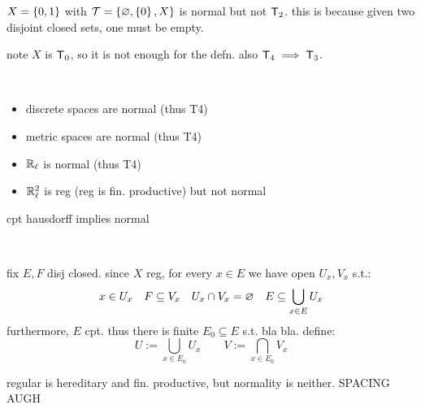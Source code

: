 \newpage
\begin{xmp}[source=Primary Source Material]
    $X=\left\{{0,1}\right\}$ with $\mathcal{T}=\left\{{\varnothing,\left\{{0}\right\},X}\right\}$ is normal but not
    $\mathsf{T}_{2}$.
    this is because given two disjoint closed sets, one must be empty.

    note $X$ is $\mathsf{T}_{0}$, so it is not enough for the defn.
    also $\mathsf{T}_{4}\implies\mathsf{T}_{3}$.
\end{xmp} \

\begin{xmp}[source=Primary Source Material]
    \vspace{-0.35in}
    \begin{itemize}
        \item discrete spaces are normal (thus T4)
        \item metric spaces are normal (thus T4)
        \item $\mathbb{R}_{\ell}$ is normal (thus T4)
        \item $\mathbb{R}_{\ell}^{2}$ is reg (reg is fin. productive) but not normal
    \end{itemize}
\end{xmp}

\begin{prop}
    cpt hausdorff implies normal
\end{prop} \

\begin{pf}[source=Primary Source Material]
    fix $E,F$ disj closed.
    since $X$ reg, for every $x\in E$ we have open $U_{x},V_{x}$ s.t.:
    \begin{equation*}
        x\in U_{x} \quad F\subseteq V_{x} \quad U_{x}\cap V_{x}=\varnothing \quad
        E\subseteq \bigcup_{x\in E}U_{x}
    \end{equation*}
    furthermore, $E$ cpt.
    thus there is finite $E_{0}\subseteq E$ s.t. bla bla. define:
    \begin{equation*}
        U:=\bigcup_{x\in E_{0}}U_{x} \qquad V:=\bigcap_{x\in E_{0}}V_{x}
    \end{equation*}
\end{pf}
regular is hereditary and fin. productive, but normality is neither.
SPACING AUGH


